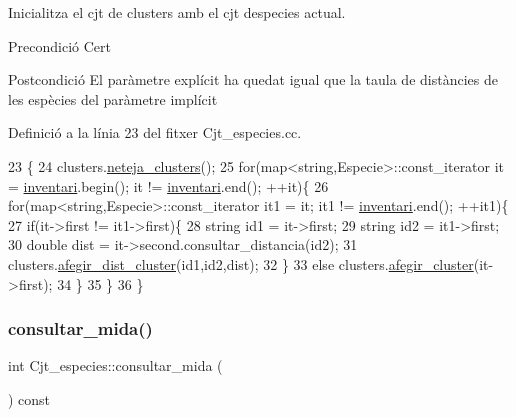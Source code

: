 Inicialitza el cjt de clusters amb el cjt d\textquotesingle{}especies actual. 

\begin{DoxyPrecond}{Precondició}
Cert 
\end{DoxyPrecond}
\begin{DoxyPostcond}{Postcondició}
El paràmetre explícit ha quedat igual que la taula de distàncies de les espècies del paràmetre implícit 
\end{DoxyPostcond}


Definició a la línia 23 del fitxer Cjt\+\_\+especies.\+cc.


\begin{DoxyCode}
23                                                                    \{
24     clusters.\hyperlink{class_cjt__clusters_a70aca86e77c34ce652d857b16cc2572f}{neteja\_clusters}();
25     \textcolor{keywordflow}{for}(map<string,Especie>::const\_iterator it = \hyperlink{class_cjt__especies_aa253bc335c8c8176b8ece5c49a15c5f3}{inventari}.begin(); it != 
      \hyperlink{class_cjt__especies_aa253bc335c8c8176b8ece5c49a15c5f3}{inventari}.end(); ++it)\{
26         \textcolor{keywordflow}{for}(map<string,Especie>::const\_iterator it1 = it; it1 != \hyperlink{class_cjt__especies_aa253bc335c8c8176b8ece5c49a15c5f3}{inventari}.end(); ++it1)\{
27             \textcolor{keywordflow}{if}(it->first != it1->first)\{
28                 \textcolor{keywordtype}{string} id1 = it->first;
29                 \textcolor{keywordtype}{string} id2 = it1->first;
30                 \textcolor{keywordtype}{double} dist = it->second.consultar\_distancia(id2);
31                 clusters.\hyperlink{class_cjt__clusters_a928bbb5f0ee0756d291ad28e453892bb}{afegir\_dist\_cluster}(id1,id2,dist);
32             \}
33             \textcolor{keywordflow}{else} clusters.\hyperlink{class_cjt__clusters_a2a27f4c57c217eeec5e91777dda19c9d}{afegir\_cluster}(it->first);
34         \}
35     \}
36 \}
\end{DoxyCode}
\mbox{\label{class_cjt__especies_a2539f8918c40587579e1b98be28bdddc}} 
\subsubsection{\texorpdfstring{consultar\+\_\+mida()}{consultar\_mida()}}
{\footnotesize\ttfamily int Cjt\+\_\+especies\+::consultar\+\_\+mida (\begin{DoxyParamCaption}{ }\end{DoxyParamCaption}) const}



